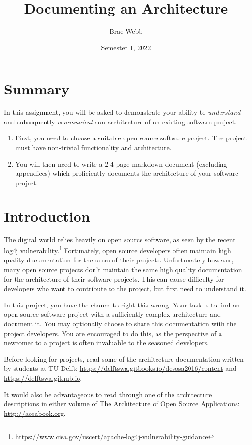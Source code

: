 \documentclass{csse4400}
\title{Documenting an Architecture}
\author{Brae Webb}
\date{Semester 1, 2022}
\begin{document}
\maketitle

\section*{Summary}
In this assignment, you will be asked to demonstrate your ability to
\textsl{understand} and subsequently \textsl{communicate} an architecture of an existing software project.
\begin{enumerate}
\item First, you need to choose a suitable open source software project.
        The project must have non-trivial functionality and architecture.
\item You will then need to write a 2-4 page markdown document (excluding appendices) which 
        proficiently documents the architecture of your software project.
\end{enumerate}

\section{Introduction}
The digital world relies heavily on open source software, as seen by the recent log4j vulnerability.\footnote{https://www.cisa.gov/uscert/apache-log4j-vulnerability-guidance}
Fortunately, open source developers often maintain high quality documentation for the users of their projects.
Unfortunately however, many open source projects don't maintain the same high quality documentation for the architecture of their software projects.
This can cause difficulty for developers who want to contribute to the project, but first need to understand it.

In this project, you have the chance to right this wrong.
Your task is to find an open source software project with a sufficiently complex architecture and document it.
You may optionally choose to share this documentation with the project developers.
You are encouraged to do this, as the perspective of a newcomer to a project is often invaluable to the seasoned developers.

Before looking for projects, read some of the architecture documentation written by students at TU Delft:
\url{https://delftswa.gitbooks.io/desosa2016/content} and \url{https://delftswa.github.io}.

It would also be advantageous to read through one of the architecture descriptions in either volume of
The Architecture of Open Source Applications: \url{http://aosabook.org}.
\end{document}
